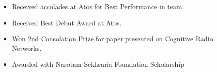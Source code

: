 \begin{itemize}
    \item Received accolades at Atos for Best Performance in team.
    \item Received Best Debut Award at Atos.
    \item Won 2nd Consolation Prize for paper presented on Cognitive Radio Networks.
    \item Awarded with Narotam Sekhsaria Foundation Scholarship
\end{itemize}







